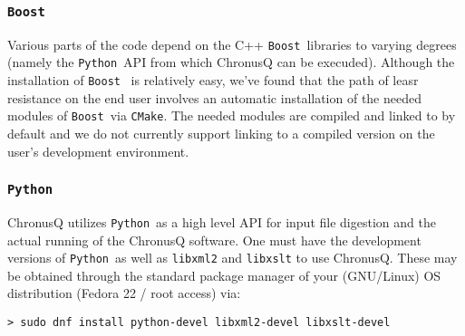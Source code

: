\documentclass[12pt]{article}
\newcommand{\CMake}{\texttt{CMake}}
\newcommand{\Boost}{\texttt{Boost}}
\newcommand{\Python}{\texttt{Python}}
\begin{document}
      \subsubsection{\Boost} \label{subsubsec:boost} 
%
%
        Various parts of the code depend on the C++ \Boost~libraries \cite{boost} to
	varying degrees (namely the \Python~API from which ChronusQ can be execuded).
	Although the installation of \Boost~ is relatively easy, we've found that
	the path of leasr resistance on the end user involves an automatic installation
	of the needed modules of \Boost~via \CMake. The needed modules are compiled
	and linked to by default and we do not currently support linking to a compiled
	version on the user's development environment.

      \subsubsection{\Python} \label{subsubsec:Python} 
        ChronusQ utilizes \Python~as a high level API for input
        file digestion and the actual running of the ChronusQ software. One
	must have the development versions of \Python~as well as \texttt{libxml2} 
	and \texttt{libxslt} to use ChronusQ. These may be obtained through the 
	standard package manager of your (GNU/Linux) OS distribution (Fedora 22 /
	root access) via:

	\begin{lstlisting}
> sudo dnf install python-devel libxml2-devel libxslt-devel
	\end{lstlisting}
\end{document}
